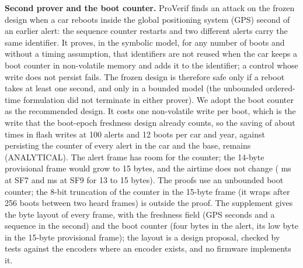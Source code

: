 \documentclass{ieeeaccess}
\begin{document}
\textbf{Second prover and the boot counter.} ProVerif finds an attack on the frozen design when a car reboots inside the global positioning system (GPS) second of an earlier alert: the sequence counter restarts and two different alerts carry the same identifier. It proves, in the symbolic model, for any number of boots and without a timing assumption, that identifiers are not reused when the car keeps a boot counter in non-volatile memory and adds it to the identifier; a control whose write does not persist fails. The frozen design is therefore safe only if a reboot takes at least one second, and only in a bounded model (the unbounded ordered-time formulation did not terminate in either prover). We adopt the boot counter as the recommended design. It costs one non-volatile write per boot, which is the write that the boot-epoch freshness design already counts, so the saving of about \ROneRatio{} times in flash writes at 100 alerts and 12 boots per car and year, against persisting the counter of every alert in the car and the base, remains (ANALYTICAL). The alert frame has room for the counter; the 14-byte provisional frame would grow to 15 bytes, and the airtime does not change (\FlashAirSeven{} ms at SF7 and \FlashAirNine{} ms at SF9 for 13 to 15 bytes). The proofs use an unbounded boot counter; the 8-bit truncation of the counter in the 15-byte frame (it wraps after 256 boots between two heard frames) is outside the proof. The supplement gives the byte layout of every frame, with the freshness field (GPS seconds and a sequence in the second) and the boot counter (four bytes in the alert, its low byte in the 15-byte provisional frame); the layout is a design proposal, checked by tests against the encoders where an encoder exists, and no firmware implements it.
\end{document}
